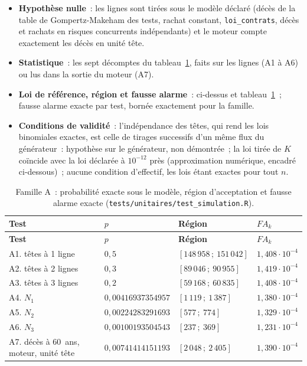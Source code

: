 \documentclass[a4paper,11pt]{article}
\newcommand{\code}[1]{\texttt{\small #1}}
\begin{document}
\begin{itemize}[leftmargin=*, itemsep=2pt]
  \item \textbf{Hypothèse nulle}~: les lignes sont tirées sous le modèle
    déclaré (décès de la table de Gompertz-Makeham des tests, rachat
    constant, \code{loi\_contrats}, décès et rachats en risques concurrents
    indépendants) et le moteur compte exactement les décès en unité tête.
  \item \textbf{Statistique}~: les sept décomptes du
    tableau~\ref{tab:constat-multi-a}, faits sur les lignes (A1 à A6) ou lus
    dans la sortie du moteur (A7).
  \item \textbf{Loi de référence, région et fausse alarme}~: ci-dessus et
    tableau~\ref{tab:constat-multi-a}~; fausse alarme exacte par test,
    bornée exactement pour la famille.
  \item \textbf{Conditions de validité}~: l'indépendance des têtes, qui
    rend les lois binomiales exactes, est celle de tirages successifs d'un
    même flux du générateur~: hypothèse sur le générateur, non démontrée~;
    la loi tirée de $K$ coïncide avec la loi déclarée à $10^{-12}$ près
    (approximation numérique, encadré ci-dessous)~; aucune condition
    d'effectif, les lois étant exactes pour tout $n$.
\end{itemize}

{\small
{}
\begin{longtable}{@{}p{6.2cm}p{2.8cm}p{3.2cm}p{2.2cm}@{}}
\caption{Famille A~: probabilité exacte sous le modèle, région
d'acceptation et fausse alarme exacte
(\code{tests/unitaires/test\_simulation.R}).}
\label{tab:constat-multi-a}\\
\rowcolor{tableheader}
\textcolor{financeblue}{\textbf{Test}} &
\textcolor{financeblue}{\textbf{$p$}} &
\textcolor{financeblue}{\textbf{Région}} &
\textcolor{financeblue}{\textbf{$FA_k$}} \\
\endfirsthead
\rowcolor{tableheader}
\textcolor{financeblue}{\textbf{Test}} &
\textcolor{financeblue}{\textbf{$p$}} &
\textcolor{financeblue}{\textbf{Région}} &
\textcolor{financeblue}{\textbf{$FA_k$}} \\
\endhead
A1. têtes à 1 ligne & $0{,}5$ & $[148\,958\,;\ 151\,042]$ & $1{,}408\cdot 10^{-4}$ \\
A2. têtes à 2 lignes & $0{,}3$ & $[89\,046\,;\ 90\,955]$ & $1{,}419\cdot 10^{-4}$ \\
A3. têtes à 3 lignes & $0{,}2$ & $[59\,168\,;\ 60\,835]$ & $1{,}408\cdot 10^{-4}$ \\
A4. $N_1$ & $0{,}00416937354957$ & $[1\,119\,;\ 1\,387]$ & $1{,}380\cdot 10^{-4}$ \\
A5. $N_2$ & $0{,}00224283291693$ & $[577\,;\ 774]$ & $1{,}329\cdot 10^{-4}$ \\
A6. $N_3$ & $0{,}00100193504543$ & $[237\,;\ 369]$ & $1{,}231\cdot 10^{-4}$ \\
A7. décès à 60~ans, moteur, unité tête & $0{,}00741414151193$ & $[2\,048\,;\ 2\,405]$ & $1{,}390\cdot 10^{-4}$ \\
\end{longtable}
}
\end{document}
